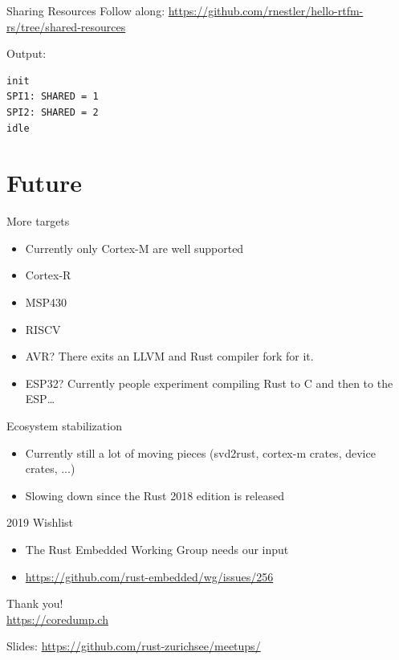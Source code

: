 \documentclass[aspectratio=1610,14pt,t]{beamer}
\begin{document}
\begin{frame}[c,fragile]{Sharing Resources}
  \small{Follow along: \url{https://github.com/rnestler/hello-rtfm-rs/tree/shared-resources}}

  Output:
  \begin{verbatim}
init
SPI1: SHARED = 1
SPI2: SHARED = 2
idle
  \end{verbatim}
\end{frame}

\section{Future}

\begin{frame}[c]{More targets}
  \begin{itemize}
    \item Currently only Cortex-M are well supported
    \item Cortex-R
    \item MSP430
    \item RISCV
    \item<2-> AVR? There exits an LLVM and Rust compiler fork for it.
    \item<2-> ESP32? Currently people experiment compiling Rust to C and then
      to the ESP\ldots
  \end{itemize}
\end{frame}

\begin{frame}[c]{Ecosystem stabilization}
  \begin{itemize}
    \item Currently still a lot of moving pieces (svd2rust, cortex-m crates,
      device crates, ...)
    \item Slowing down since the Rust 2018 edition is released
  \end{itemize}
\end{frame}

\begin{frame}[c]{2019 Wishlist}
  \begin{itemize}
    \item The Rust Embedded Working Group needs our input
    \item \url{https://github.com/rust-embedded/wg/issues/256}
  \end{itemize}
\end{frame}


{
\begin{frame}[standout]
  \begin{centering}
    {\Huge Thank you!}\\
    {\normalsize \url{https://coredump.ch}}\\
  \end{centering}
  {\small Slides: \url{https://github.com/rust-zurichsee/meetups/}}\\
  \vspace{3cm}
\end{frame}
}
\end{document}
